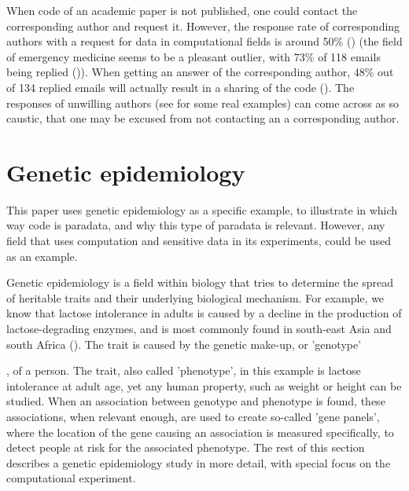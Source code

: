 When code of an academic paper is not published, 
one could contact the corresponding author and request it.
However, the response rate of corresponding authors 
with a request for data in computational fields is around 50\% 
(\cite{manca2018non, stodden2018empirical, teunis2015corresponding}) 
(the field of emergency medicine seems to be a pleasant outlier, 
with 73\% of 118 emails being replied (\cite{o2003email})).
When getting an answer of the corresponding author, 
48\% out of 134 replied emails will actually result 
in a sharing of the code (\cite{stodden2018empirical}).
The responses of unwilling authors (see \cite{stodden2018empirical} for 
some real examples) can come across as so caustic, 
that one may be excused from not contacting an a corresponding author.

\section{Genetic epidemiology}


This paper uses genetic epidemiology as a specific example,
to illustrate in which way code is paradata,
and why this type of paradata is relevant.
However, any field that uses computation 
and sensitive data in its experiments,
could be used as an example.


Genetic epidemiology is a field within biology that
tries to determine the spread of heritable traits 
and their underlying biological mechanism.
For example, we know that lactose intolerance in adults is
caused by a decline in the production of lactose-degrading enzymes,
and is most commonly found in south-east Asia and south 
Africa (\cite{storhaug2017country}).
The trait is caused by the genetic make-up, or 'genotype'

, of a person.
The trait, also called 'phenotype', 
in this example is lactose intolerance at adult age,
yet any human property, such as weight or height can be studied.
When an association between genotype and phenotype is found,
these associations, when relevant enough, are used to 
create so-called 'gene panels', 
where the location of the gene causing 
an association is measured specifically, 
to detect people at risk for the associated phenotype.
The rest of this section describes a genetic epidemiology study 
in more detail, with special focus on the computational experiment.

